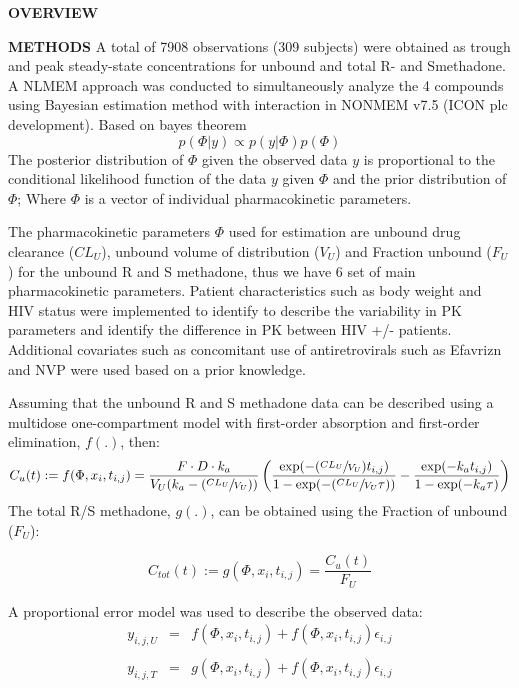 \documentclass[final]{beamer}
\newlength{\colwidth}
\begin{document}
\begin{frame}[t]
\begin{columns}[t]
\begin{column}{\colwidth}
\begin{block}{\textbf{OVERVIEW}}
  \end{block}
  \begin{block}{\textbf{METHODS}}
 A total of 7908 observations (309 subjects) were obtained as trough and
peak steady-state concentrations for unbound and total R- and Smethadone.
A NLMEM approach was conducted to simultaneously
analyze the 4 compounds using Bayesian estimation method with
interaction in NONMEM v7.5 (ICON plc development). Based on bayes
theorem  \begin{equation}\label{eq:1}
  p(\Phi|y) \propto p(y|\Phi) p(\Phi)
  \end{equation}
  The posterior distribution of $\Phi$ given the observed data $y$ is proportional to the conditional likelihood function of the data $y$ given $\Phi$ and the prior distribution of $\Phi$; Where $\Phi$ is a vector of individual pharmacokinetic parameters. \par
  The pharmacokinetic parameters $\Phi$ used for estimation are unbound drug clearance ($CL_U$), unbound volume of distribution ($V_U$) and Fraction unbound ($F_U$) for the unbound R and S methadone, thus we have 6 set of main pharmacokinetic parameters. Patient characteristics such as body weight and HIV status were implemented to identify to describe the variability in PK parameters and identify the difference in PK between HIV +/- patients. Additional covariates such as concomitant use of antiretrovirals such as Efavrizn and NVP were used based on a prior knowledge.  \par
Assuming that the unbound R and S methadone data can be described using a multidose one-compartment model with first-order absorption and first-order elimination, $f(.)$, then:
\begin{equation}\label{eq:2}
	C_u(t) := f(\Phi, x_i, t_{i,j}) = \frac{F \cdot D \cdot k_a}{V_U(k_a - (\sfrac{CL_U}{V_U}))} \left(\frac{\exp(-(\sfrac{CL_U}{V_U}) t_{i,j})}{1 - \exp(-(\sfrac{CL_U}{V_U}\tau))} - \frac{\exp(-k_a t_{i,j})}{1 - \exp(-k_a\tau)}\right)
\end{equation}
The total R/S methadone, $g(.)$, can be obtained using the Fraction of unbound ($F_U$):

\begin{equation}\label{eq:3}
	C_{tot}(t) := g(\Phi, x_i, t_{i,j}) = \frac{C_u(t)}{F_U}
\end{equation}

A proportional error model was used to describe the observed data:
\begin{eqnarray*}
	y_{i,j,U} &=& f(\Phi, x_i, t_{i,j}) + f(\Phi, x_i, t_{i,j})\epsilon_{i,j}\\
	~\\
	y_{i,j,T} &=& g(\Phi, x_i, t_{i,j}) + f(\Phi, x_i, t_{i,j})\epsilon_{i,j}
\end{eqnarray*}


\end{block}
\end{column}
\end{columns}
\end{frame}
\end{document}
